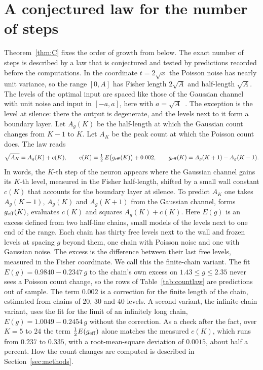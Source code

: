 
\section{A conjectured law for the number of steps}\label{sec:countlaw}

Theorem~\ref{thm:C} fixes the order of growth from below. The exact number of steps is described by a law that is conjectured and
tested by predictions recorded before the computations. In the coordinate $t=2\sqrt x$ the Poisson noise has nearly unit variance,
so the range $[0,A]$ has Fisher length $2\sqrt A$ and half-length $\sqrt A$. The levels of the optimal input are spaced like those
of the Gaussian channel with unit noise and input in $[-a,a]$, here with $a=\sqrt A$~\cite{Paper1}. The exception is the level at silence: there the output
is degenerate, and the levels next to it form a boundary layer. Let $A_g(K)$ be the half-length at which the Gaussian count changes
from $K-1$ to $K$. Let $A_K$ be the peak count at which the Poisson count does. The law reads
\begin{equation}
\sqrt{A_K}=A_g(K)+c(K),\qquad c(K)=\tfrac12\,E\bigl(g_{\rm eff}(K)\bigr)+0.002,\qquad g_{\rm eff}(K)=A_g(K+1)-A_g(K-1).\label{eq:countlaw}
\end{equation}
In words, the $K$-th step of the neuron appears where the Gaussian channel gains its $K$-th level, measured in the Fisher
half-length, shifted by a small wall constant $c(K)$ that accounts for the boundary layer at silence. To predict $A_K$ one takes
$A_g(K-1)$, $A_g(K)$ and $A_g(K+1)$ from the Gaussian channel, forms $g_{\rm eff}(K)$, evaluates $c(K)$ and squares
$A_g(K)+c(K)$. Here $E(g)$ is an excess defined from two half-line chains, small models of the levels next to one end of the range.
Each chain has thirty free levels next to the wall and frozen levels at spacing $g$ beyond them, one chain with Poisson noise and one
with Gaussian noise. The excess is the difference
between their last free levels, measured in the Fisher coordinate. We call this the finite-chain variant. The fit $E(g)=0.9840-0.2347\,g$
to the chain's own excess on $1.43\le g\le2.35$ never sees a Poisson count change, so the rows of Table~\ref{tab:countlaw} are
predictions out of sample. The term $0.002$ is a correction for the finite length of the chain, estimated
from chains of 20, 30 and 40 levels. A second variant, the infinite-chain variant, uses the fit for the limit of an infinitely long chain, $E(g)=1.0049-0.2454\,g$ without the
correction. As a check after the fact, over $K=5$ to $24$ the term $\frac12E(g_{\rm eff})$ alone matches the measured $c(K)$, which runs from $0.237$ to $0.335$, with a root-mean-square deviation of $0.0015$, about half a percent.
How the count changes are computed is described in Section~\ref{sec:methods}.

